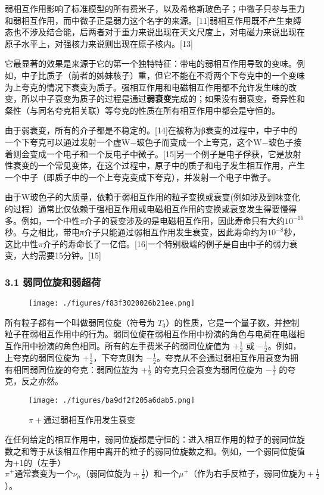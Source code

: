 弱相互作用影响了标准模型的所有费米子，以及希格斯玻色子；中微子只参与重力和弱相互作用，而中微子正是弱力这个名字的来源。[11]弱相互作用既不产生束缚态也不涉及结合能，后两者对于重力来说出现在天文尺度上，对电磁力来说出现在原子水平上，对强核力来说则出现在原子核内。[13]

它最显著的效果是来源于它的第一个独特特征：带电的弱相互作用导致的变味。例如，中子比质子（前者的姊妹核子）重，但它不能在不将两个下夸克中的一个变味为上夸克的情况下衰变为质子。强相互作用和电磁相互作用都不允许发生味的改变，所以中子衰变为质子的过程是通过\textbf{弱衰变}完成的；如果没有弱衰变，奇异性和粲性（与同名夸克相关联）等夸克的性质在所有相互作用中都会是守恒的。

由于弱衰变，所有的介子都是不稳定的。[14]在被称为β衰变的过程中，中子中的一个下夸克可以通过发射一个虚W−玻色子而变成一个上夸克，这个W−玻色子接着则会变成一个电子和一个反电子中微子。[15]另一个例子是电子俘获，它是放射性衰变的一个常见变体，在这个过程中，原子中的质子和电子发生相互作用，产生一个中子（即质子中的一个上夸克变成下夸克），并发射一个电子中微子。

由于W玻色子的大质量，依赖于弱相互作用的粒子变换或衰变(例如涉及到味变化的过程）通常比仅依赖于强相互作用或电磁相互作用的变换或衰变发生得要慢得多。例如，一个中性$\pi$介子的衰变涉及的是电磁相互作用，因此寿命只有大约$10^{-16}$秒。与之相比，带电π介子只能通过弱相互作用发生衰变，因此寿命约为$10^{-8}$秒，这比中性$\pi$介子的寿命长了一亿倍。[16]一个特别极端的例子是自由中子的弱力衰变，大约需要15分钟。[15]

\subsubsection{3.1 弱同位旋和弱超荷}
\begin{figure}[ht]
\centering
\texttt{[image: ./figures/f83f3020026b21ee.png]}
\caption\label{fig_RXHZY_4}
\end{figure}

所有粒子都有一个叫做弱同位旋（符号为 $T_3$）的性质，它是一个量子数，并控制粒子在弱相互作用中的行为。弱同位旋在弱相互作用中扮演的角色与电荷在电磁相互作用中扮演的角色相同。所有的左手费米子的弱同位旋值为 $+\frac{1}{2}$ 或 $-\frac{1}{2}$。例如，上夸克的弱同位旋为 $+\frac{1}{2}$，下夸克则为 $-\frac{1}{2}$。夸克从不会通过弱相互作用衰变为拥有相同弱同位旋的夸克：弱同位旋为 $+\frac{1}{2}$ 的夸克只会衰变为弱同位旋为 $-\frac{1}{2}$ 的夸克，反之亦然。
\begin{figure}[ht]
\centering
\texttt{[image: ./figures/ba9df2f205a6dab5.png]}
\caption{$\pi+$通过弱相互作用发生衰变} \label{fig_RXHZY_5}
\end{figure}
在任何给定的相互作用中，弱同位旋都是守恒的：进入相互作用的粒子的弱同位旋数之和等于从该相互作用中离开的粒子的弱同位旋数之和。例如，一个弱同位旋值为+1的（左手）$\pi^+\text{通常衰变为一个}\nu_\mu\text{（弱同位旋为}+\frac{1}{2}\text{）和一个}\mu^+\text{（作为右手反粒子，弱同位旋为}+\frac{1}{2}$）。


